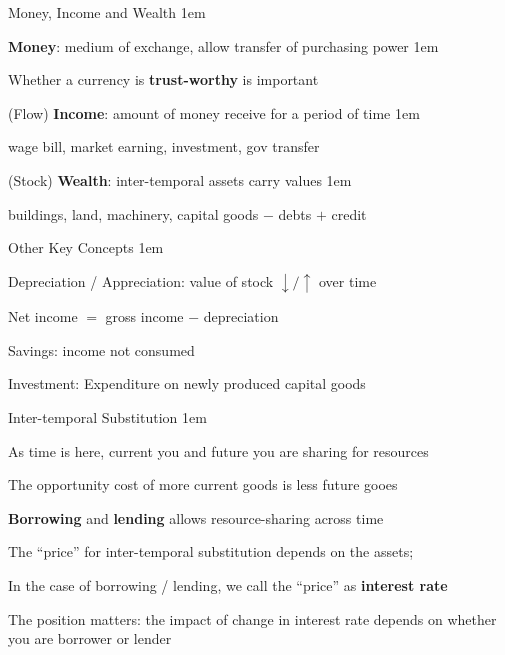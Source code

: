 \documentclass[11pt,aspectratio=43,usenames,dvipsnames]{beamer}
\let\olditemize=\itemize
\let\endolditemize=\enditemize
\renewenvironment{itemize}{\olditemize \itemsep1em}{\endolditemize}
\theoremstyle{definition}
\begin{document}
\begin{frame}{Money, Income and Wealth}
\label{slide:Money__Income_and_Wealth}
    \begin{itemize}
        \item \textbf{Money}: medium of exchange, allow \alert{transfer} of purchasing power
        \begin{itemize}
            \item Whether a currency is \textbf{trust-worthy} is important
        \end{itemize}
        \item (Flow) \textbf{Income}: amount of money receive for a period of time
        \begin{itemize}
            \item wage bill, market earning, investment, gov transfer
        \end{itemize}
        \item (Stock) \textbf{Wealth}: inter-temporal assets carry values
        \begin{itemize}
            \item buildings, land, machinery, capital goods $ - $ debts $ + $ credit
        \end{itemize}
    \end{itemize}
\end{frame}

\begin{frame}{Other Key Concepts}
\label{slide:Other_Key_Concepts}
    \begin{itemize}
        \item Depreciation / Appreciation: value of stock $ \downarrow / \uparrow  $ over time
        \item Net income $ = $ gross income $ - $ depreciation
        \item Savings: income not consumed
        \item Investment: Expenditure on newly produced capital goods
    \end{itemize}
\end{frame}

\begin{frame}{Inter-temporal Substitution}
\label{slide:Inter_temporal_Substitution}
    \begin{itemize}
        \item As time is here, \alert{current you} and \alert{future you} are sharing for resources
        \item The opportunity cost of \alert{more current goods} is \alert{less future gooes}
        \item \textbf{Borrowing} and \textbf{lending} allows resource-sharing across time
        \item The ``price'' for inter-temporal substitution depends on the assets;
        \item In the case of borrowing / lending, we call the ``price'' as \textbf{interest rate}
        \item The position matters: the impact of change in interest rate depends on whether you are \alert{borrower} or \alert{lender}
    \end{itemize}
\end{frame}
\end{document}
